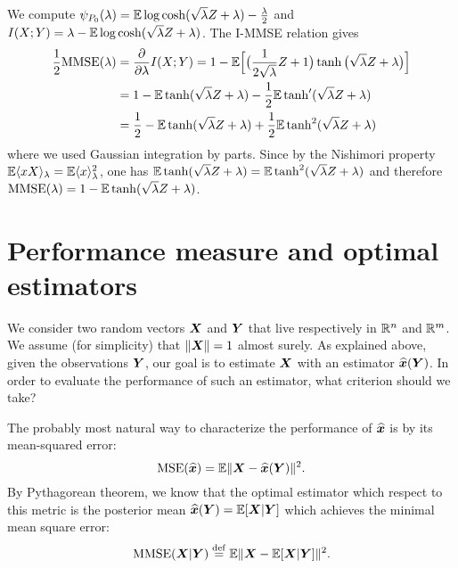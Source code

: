 \documentclass[12pt,nocut]{article}
\begin{document}
\begin{example}[Rademacher prior: $P_0 = \frac{1}{2} \delta_{+1} + \frac{1}{2} \delta_{-1}$] We compute $\psi_{P_0}(\lambda) = \mathbb{E} \log \cosh(\sqrt{\lambda} Z + \lambda)- \frac{\lambda}{2}$ and $I(X;Y) = \lambda - \mathbb{E} \log \cosh(\sqrt{\lambda} Z + \lambda)$. The I-MMSE relation gives
			\begin{align*}
				\frac{1}{2} {{\rm MMSE}}(\lambda) 
				&= \frac{\partial}{\partial \lambda} I(X;Y)
				= 1 - \mathbb{E} \Big[\big(\frac{1}{2\sqrt{\lambda}}Z+1\big) \tanh\big(\sqrt{\lambda}Z + \lambda\big)\Big]
				\\
				&= 1 - \mathbb{E} \tanh(\sqrt{\lambda}Z + \lambda) - \frac{1}{2} \mathbb{E} \tanh'(\sqrt{\lambda}Z + \lambda)
				\\
				&= \frac{1}{2} - \mathbb{E} \tanh(\sqrt{\lambda}Z + \lambda) + \frac{1}{2} \mathbb{E} \tanh^2(\sqrt{\lambda}Z + \lambda)
			\end{align*}
			where we used Gaussian integration by parts. Since by the Nishimori property $\mathbb{E} \langle x X \rangle_{\lambda} = \mathbb{E} \langle x \rangle_{\lambda}^2$, one has $\mathbb{E} \tanh(\sqrt{\lambda}Z + \lambda) = \mathbb{E} \tanh^2(\sqrt{\lambda}Z + \lambda)$ and therefore ${{\rm MMSE}}(\lambda) = 1 - \mathbb{E} \tanh(\sqrt{\lambda}Z + \lambda)$.
\end{example}






\section{Performance measure and optimal estimators}\label{sec:performance}

We consider two random vectors ${\boldsymbol X}$ and ${\boldsymbol Y}$ that live respectively in $\mathbb{R}^n$ and $\mathbb{R}^m$. 
We assume (for simplicity) that $\|{\boldsymbol X}\| = 1$ almost surely. 
As explained above, given the observations ${\boldsymbol Y}$, our goal is to estimate ${\boldsymbol X}$ with an estimator $\widehat{{\boldsymbol x}}({\boldsymbol Y})$. 
In order to evaluate the performance of such an estimator, what criterion should we take?

The probably most natural way to characterize the performance of $\widehat{{\boldsymbol x}}$ is by its mean-squared error:
$$
{{\rm MSE}}(\widehat{{\boldsymbol x}}) = \mathbb{E} \| {\boldsymbol X} - \widehat{{\boldsymbol x}}({\boldsymbol Y}) \|^2.
$$
By Pythagorean theorem, we know that the optimal estimator which respect to this metric is the posterior mean $\widehat{{\boldsymbol x}}({\boldsymbol Y}) = \mathbb{E}[{\boldsymbol X}| {\boldsymbol Y}]$ which achieves the minimal mean square error:
\begin{equation}\label{eq:def_mmse0}
	{{\rm MMSE}}({\boldsymbol X}|{\boldsymbol Y}) \overset{{\rm def}}{=} \mathbb{E} \| {\boldsymbol X} - \mathbb{E}[{\boldsymbol X}|{\boldsymbol Y}] \|^2.
\end{equation}
\end{document}
